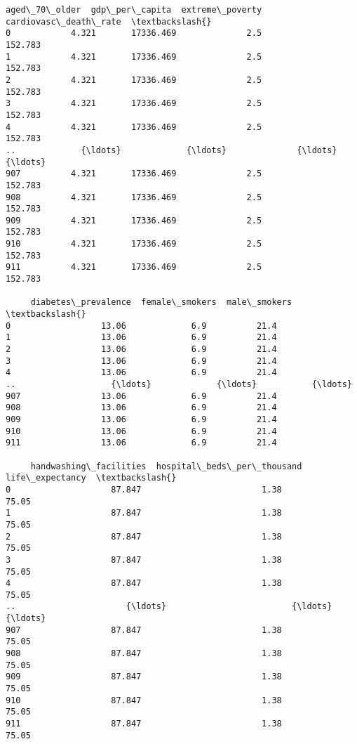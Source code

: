 \documentclass[11pt]{article}
\begin{document}
\begin{tcolorbox}[breakable, size=fbox, boxrule=.5pt, pad at break*=1mm, opacityfill=0]
\begin{Verbatim}[commandchars=\\\{\}]
     aged\_70\_older  gdp\_per\_capita  extreme\_poverty  cardiovasc\_death\_rate  \textbackslash{}
0            4.321       17336.469              2.5                152.783
1            4.321       17336.469              2.5                152.783
2            4.321       17336.469              2.5                152.783
3            4.321       17336.469              2.5                152.783
4            4.321       17336.469              2.5                152.783
..             {\ldots}             {\ldots}              {\ldots}                    {\ldots}
907          4.321       17336.469              2.5                152.783
908          4.321       17336.469              2.5                152.783
909          4.321       17336.469              2.5                152.783
910          4.321       17336.469              2.5                152.783
911          4.321       17336.469              2.5                152.783

     diabetes\_prevalence  female\_smokers  male\_smokers  \textbackslash{}
0                  13.06             6.9          21.4
1                  13.06             6.9          21.4
2                  13.06             6.9          21.4
3                  13.06             6.9          21.4
4                  13.06             6.9          21.4
..                   {\ldots}             {\ldots}           {\ldots}
907                13.06             6.9          21.4
908                13.06             6.9          21.4
909                13.06             6.9          21.4
910                13.06             6.9          21.4
911                13.06             6.9          21.4

     handwashing\_facilities  hospital\_beds\_per\_thousand  life\_expectancy  \textbackslash{}
0                    87.847                        1.38            75.05
1                    87.847                        1.38            75.05
2                    87.847                        1.38            75.05
3                    87.847                        1.38            75.05
4                    87.847                        1.38            75.05
..                      {\ldots}                         {\ldots}              {\ldots}
907                  87.847                        1.38            75.05
908                  87.847                        1.38            75.05
909                  87.847                        1.38            75.05
910                  87.847                        1.38            75.05
911                  87.847                        1.38            75.05


\end{Verbatim}
\end{tcolorbox}
\end{document}
